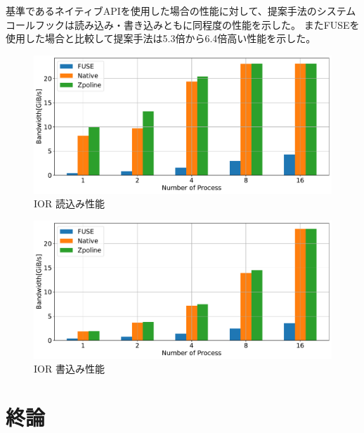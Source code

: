 \documentclass[a4paper,11pt]{jreport}
\begin{document}
基準であるネイティブAPIを使用した場合の性能に対して、提案手法のシステムコールフックは読み込み・書き込みともに同程度の性能を示した。
またFUSEを使用した場合と比較して提案手法は5.3倍から6.4倍高い性能を示した。

\newpage

\begin{figure}[h]
	\begin{minipage}[b]{1\columnwidth}
		\centering
		\includegraphics[width=0.9\linewidth]{./figure/ior_benchmark_read.pdf}
		\caption{IOR 読込み性能}
		\label{fig:Evaluation read}
	\end{minipage}
\end{figure}

\begin{figure}[h]
    \begin{minipage}[b]{1\columnwidth}
		\centering
		\includegraphics[width=0.9\linewidth]{./figure/ior_benchmark_write.pdf}
		\caption{IOR 書込み性能}
		\label{fig:Evaluation write}
	\end{minipage}
\end{figure}

\chapter{終論}
\end{document}
